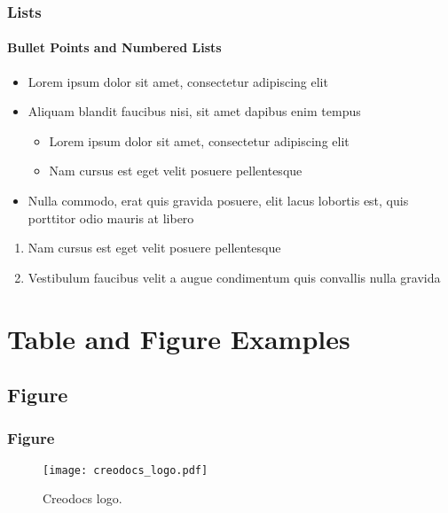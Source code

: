 \begin{frame}
    \frametitle{Lists}
    \framesubtitle{Bullet Points and Numbered Lists} %

    \begin{itemize}
        \item Lorem ipsum dolor sit amet, consectetur adipiscing elit
        \item Aliquam blandit faucibus nisi, sit amet dapibus enim tempus
              \begin{itemize}
                  \item Lorem ipsum dolor sit amet, consectetur adipiscing elit
                  \item Nam cursus est eget velit posuere pellentesque
              \end{itemize}
        \item Nulla commodo, erat quis gravida posuere, elit lacus lobortis est, quis porttitor odio mauris at libero
    \end{itemize}

    \bigskip %

    \begin{enumerate}
        \item Nam cursus est eget velit posuere pellentesque
        \item Vestibulum faucibus velit a augue condimentum quis convallis nulla gravida
    \end{enumerate}
\end{frame}


\section{Table and Figure Examples}



\subsection{Figure}

\begin{frame}
    \frametitle{Figure}

    \begin{figure}
        \texttt{[image: creodocs\_logo.pdf]}
        \caption{Creodocs logo.}
    \end{figure}
\end{frame}
